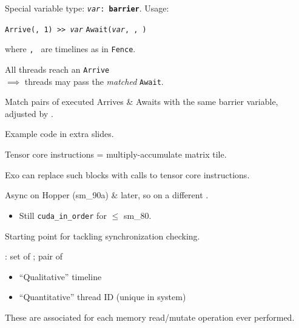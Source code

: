 {\LARGE
Special variable type: \texttt{\textit{var}: \textbf{barrier}}. Usage:

\hfill \texttt{Arrive(, 1) >> \textit{var}} \hfill \texttt{Await(\textit{var}, , )} \hfill

where \texttt{, } are timelines as in \texttt{Fence}.

\vspace{5mm}

All threads reach an \texttt{Arrive}\\
$\implies$ threads may pass the \textit{matched} \texttt{Await}.

\vspace{5mm}

Match pairs of executed Arrives \& Awaits with the same barrier variable, adjusted by .

\vfill

\hfill Example code in extra slides.

}


\newpage
{}

{\LARGE
Tensor core instructions = multiply-accumulate matrix tile.

}

{\large

}

{\LARGE
Exo can replace such blocks with calls to  tensor core instructions.

Async on Hopper (sm\_90a) \& later, so on a different .
\begin{itemize}
  \item Still \texttt{cuda\_in\_order} for $\le$ sm\_80.
\end{itemize}
}

\newpage
{}

{\LARGE
Starting point for tackling synchronization checking.

\vspace{5mm}

: set of ; pair of
\begin{itemize}
  \item ``Qualitative'' timeline
  \item ``Quantitative'' thread ID (unique in system)
\end{itemize}

\vspace{5mm}

These are associated for each memory read/mutate operation ever performed.

}


